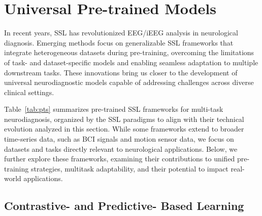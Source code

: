 


\section{Universal Pre-trained Models}
\label{sec:bm}

In recent years, SSL has revolutionized EEG/iEEG analysis in neurological diagnosis. Emerging methods focus on generalizable SSL frameworks that integrate heterogeneous datasets during pre-training, overcoming the limitations of task- and dataset-specific models and enabling seamless adaptation to multiple downstream tasks.
These innovations bring us closer to the development of universal neurodiagnostic models capable of addressing challenges across diverse clinical settings.

Table~\ref{tab:pts} summarizes pre-trained SSL frameworks for multi-task neurodiagnosis, organized by the SSL paradigms to align with their technical evolution analyzed in this section. 
While some frameworks extend to broader time-series data, such as BCI signals and motion sensor data, we focus on datasets and tasks directly relevant to neurological applications.
Below, we further explore these frameworks, examining their contributions to unified pre-training strategies, multitask adaptability, and their potential to impact real-world applications.

\subsection{Contrastive- and Predictive- Based Learning}

